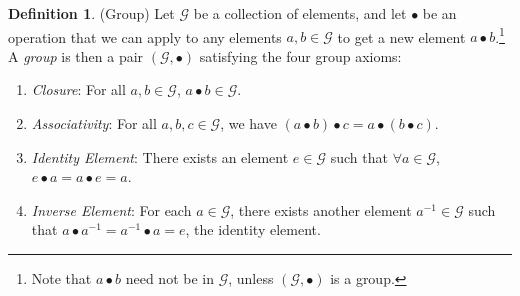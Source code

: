 \documentclass[12pt]{book}
\numberwithin{equation}{section} %
\theoremstyle{plain}
\theoremstyle{definition}
\newtheorem{defn}[thm]{Definition}
\theoremstyle{remark}
\newcommand{\calG}{\mathcal{G}}
\begin{document}
\begin{defn}(Group)
Let $\calG$ be a collection of elements, and let $\bullet$ be an
operation that we can apply to any elements $a,b\in\calG$ to get a new
element $a\bullet b$.\footnote{%
  Note that $a\bullet b$ need not be in $\calG$, unless
  $(\calG,\bullet)$ is a group.
}
A \emph{group} is then a pair $(\calG,\bullet)$ satisfying the four
group axioms:
\begin{enumerate}[label=(\roman*)]
  \item \emph{Closure}: For all $a,b\in\calG$, $a\bullet b\in\calG$.
  \item \emph{Associativity}:
    For all $a,b,c\in\calG$,
    we have $(a\bullet b)\bullet c= a\bullet (b\bullet c)$.
  \item \emph{Identity Element}:
    There exists an element $e\in\calG$ such that $\forall a\in\calG$,
    $e\bullet a=a\bullet e= a$.
  \item \emph{Inverse Element}:
    For each $a\in\calG$, there exists another element $a^{-1}\in\calG$
    such that $a\bullet a^{-1}=a^{-1}\bullet a=e$, the identity element.
\end{enumerate}
\end{defn}
\end{document}
